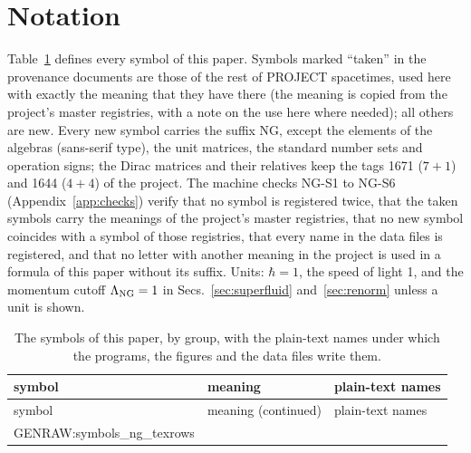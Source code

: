 \appendix
\onecolumngrid

\section{Notation}
\label{app:notation}

Table~\ref{tab:symbols} defines every symbol of this paper. Symbols marked ``taken'' in the
provenance documents are those of the rest of PROJECT spacetimes, used here with exactly the meaning
that they have there (the meaning is copied from the project's master registries, with a note on the
use here where needed); all others are new. Every new symbol carries the suffix NG, except the elements
of the algebras (sans-serif type), the unit matrices, the standard number sets and operation signs; the
Dirac matrices and their relatives keep the tags 1671 ($7+1$) and 1644 ($4+4$) of the project. The
machine checks NG-S1 to NG-S6 (Appendix~\ref{app:checks}) verify that no symbol is registered twice,
that the taken symbols carry the meanings of the project's master registries, that no new symbol
coincides with a symbol of those registries, that every name in the data files is registered, and that
no letter with another meaning in the project is used in a formula of this paper without its suffix.
Units: $\hbar=1$, the speed of light 1, and the momentum cutoff $\Lambda_{\rm NG}=1$ in
Secs.~\ref{sec:superfluid} and~\ref{sec:renorm} unless a unit is shown.

{\small
\begin{longtable}{p{}p{}>{\raggedright\arraybackslash\footnotesize}p{}}
\caption{The symbols of this paper, by group, with the plain-text names under which the programs, the
figures and the data files write them.}\label{tab:symbols}\\
\toprule
symbol & meaning & plain-text names\\
\midrule
\endfirsthead
\toprule
symbol & meaning (continued) & plain-text names\\
\midrule
\endhead
\bottomrule
\endfoot
{{GENRAW:symbols_ng_texrows}}
\end{longtable}
}

